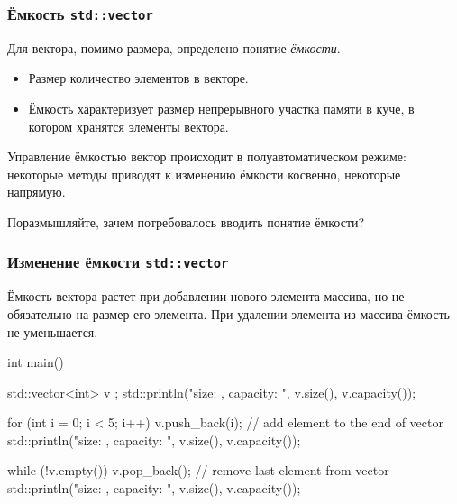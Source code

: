 \documentclass[compress, 8pt]{beamer}
\begin{document}
  \begin{frame}[fragile]

    \frametitle{Ёмкость \texttt{std::vector}}

    Для вектора, помимо размера, определено понятие \textit{ёмкости}.
    \hfill \break

    \begin{itemize}
      \item Размер \textemdash \space количество элементов в векторе.
      \item Ёмкость \textemdash \space характеризует размер непрерывного
        участка памяти в куче, в котором хранятся элементы вектора.
    \end{itemize}
    \hfill \break

    Управление ёмкостью вектор происходит в полуавтоматическом режиме:
    некоторые методы приводят к изменению ёмкости косвенно,
    некоторые \textemdash \space напрямую.

    \begin{task}
      Поразмышляйте, зачем потребовалось вводить понятие ёмкости?
    \end{task}

  \end{frame}

  \begin{frame}[fragile]

    \frametitle{Изменение ёмкости \texttt{std::vector}}

    Ёмкость вектора растет при добавлении нового элемента массива,
    но не обязательно на размер его элемента.
    При удалении элемента из массива ёмкость не уменьшается.

    \begin{mycppinplacelisting}
int main() {
    std::vector<int> v {};
    std::println("size: {}, capacity: {}",
        v.size(), v.capacity());

    for (int i = 0; i < 5; i++) {
        v.push_back(i); // add element to the end of vector
        std::println("size: {}, capacity: {}",
            v.size(), v.capacity());
    }

    while (!v.empty()) {
        v.pop_back(); // remove last element from vector
        std::println("size: {}, capacity: {}",
            v.size(), v.capacity());
    }
}
    \end{mycppinplacelisting}

  \end{frame}
\end{document}
